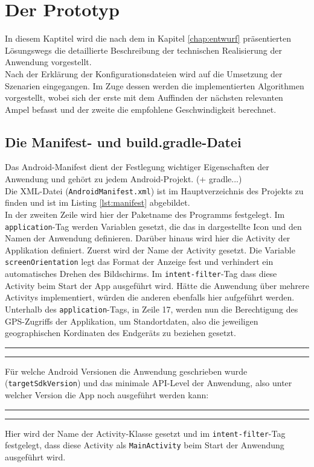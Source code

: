 \chapter{\label{chap:implementierung}Der Prototyp}
In diesem Kaptitel wird die nach dem in Kapitel \ref{chap:entwurf} präsentierten Lösungswegs die detaillierte Beschreibung der technischen Realisierung der Anwendung vorgestellt.\\
Nach der Erklärung der Konfigurationsdateien wird auf die Umsetzung der Szenarien eingegangen. Im Zuge dessen werden die implementierten Algorithmen vorgestellt, wobei sich der erste mit dem Auffinden der nächsten relevanten Ampel befasst und der zweite die empfohlene Geschwindigkeit berechnet.
%
%
\section{Die Manifest- und build.gradle-Datei}
Das Android-Manifest dient der Festlegung wichtiger Eigenschaften der Anwendung und gehört zu jedem Android-Projekt. (+ gradle...)\\

Die \gls{XML}-Datei (\texttt{AndroidManifest.xml}) ist im Hauptverzeichnis des Projekts zu finden und ist im Listing \ref{lst:manifest} abgebildet. \\
In der zweiten Zeile wird hier der Paketname des Programms festgelegt. 
Im \texttt{application}-Tag werden Variablen gesetzt, die das in dargestellte Icon und den Namen der Anwendung definieren. Darüber hinaus wird hier die \gls{Activity} der Applikation definiert. Zuerst wird der Name der \gls{Activity} gesetzt. Die Variable \texttt{screenOrientation} legt das Format der Anzeige fest und verhindert ein automatisches Drehen des Bildschirms. Im \texttt{intent-filter}-Tag dass diese Activity beim Start der App ausgeführt wird. Hätte die Anwendung über mehrere \glspl{Activity} implementiert, würden die anderen ebenfalls hier aufgeführt werden.\\
Unterhalb des \texttt{application}-Tags, in Zeile 17, werden nun die Berechtigung des \gls{GPS}-Zugriffs der Applikation, um Standortdaten, also die jeweiligen geographischen Kordinaten des Endgeräts zu beziehen gesetzt.
\begin{center}
\rule{35em}{0.5pt} 
 \rule{35em}{0.5pt}
\end{center}
Für welche Android Versionen die Anwendung geschrieben wurde (\texttt{targetSdkVersion}) und das minimale \gls{API}-Level der Anwendung, also unter welcher Version die App noch ausgeführt werden kann:
\begin{center}
\rule{35em}{0.5pt}  \rule{35em}{0.5pt}
\end{center}
Hier wird der Name der \gls{Activity}-Klasse gesetzt und im \texttt{intent-filter}-Tag festgelegt, dass diese \gls{Activity} als \texttt{MainActivity} beim Start der Anwendung ausgeführt wird. 
%
%
